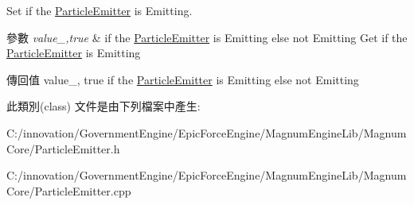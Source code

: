 Set if the \hyperlink{class_i_dream_sky_1_1_particle_emitter}{Particle\+Emitter} is Emitting. 


\begin{DoxyParams}{參數}
{\em value\+\_\+,true} & if the \hyperlink{class_i_dream_sky_1_1_particle_emitter}{Particle\+Emitter} is Emitting else not Emitting Get if the \hyperlink{class_i_dream_sky_1_1_particle_emitter}{Particle\+Emitter} is Emitting \\
\hline
\end{DoxyParams}
\begin{DoxyReturn}{傳回值}
value\+\_\+, true if the \hyperlink{class_i_dream_sky_1_1_particle_emitter}{Particle\+Emitter} is Emitting else not Emitting 
\end{DoxyReturn}


此類別(class) 文件是由下列檔案中產生\+:\begin{DoxyCompactItemize}
\item 
C\+:/innovation/\+Government\+Engine/\+Epic\+Force\+Engine/\+Magnum\+Engine\+Lib/\+Magnum\+Core/Particle\+Emitter.\+h\item 
C\+:/innovation/\+Government\+Engine/\+Epic\+Force\+Engine/\+Magnum\+Engine\+Lib/\+Magnum\+Core/Particle\+Emitter.\+cpp\end{DoxyCompactItemize}
